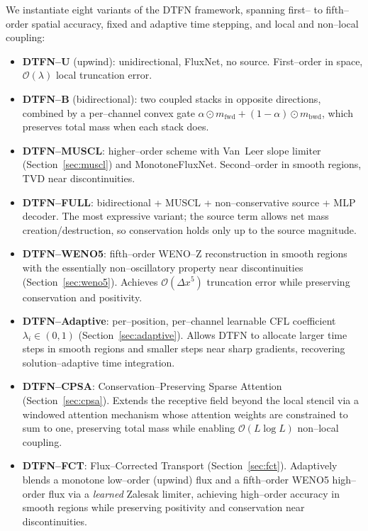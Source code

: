 \documentclass[10pt]{article}
\theoremstyle{definition}
\theoremstyle{remark}
\begin{document}
We instantiate eight variants of the DTFN framework, spanning
first-- to fifth--order spatial accuracy, fixed and adaptive time
stepping, and local and non--local coupling:

\begin{itemize}[leftmargin=*,itemsep=2pt]
  \item \textbf{DTFN--U} (upwind): unidirectional, FluxNet, no source.
        First--order in space, $\mathcal{O}(\lambda)$ local truncation
        error.
  \item \textbf{DTFN--B} (bidirectional): two coupled stacks in
        opposite directions, combined by a per--channel convex gate
        $\alpha\odot m_\text{fwd} + (1-\alpha)\odot m_\text{bwd}$,
        which preserves total mass when each stack does.
  \item \textbf{DTFN--MUSCL}: higher--order scheme with Van~Leer slope
        limiter (Section~\ref{sec:muscl}) and MonotoneFluxNet.
        Second--order in smooth regions, TVD near discontinuities.
  \item \textbf{DTFN--FULL}: bidirectional + MUSCL + non--conservative
        source + MLP decoder.  The most expressive variant; the source
        term allows net mass creation/destruction, so conservation
        holds only up to the source magnitude.
  \item \textbf{DTFN--WENO5}: fifth--order WENO--Z reconstruction
        \cite{borges2008improved} in smooth regions with the
        essentially non--oscillatory property near discontinuities
        (Section~\ref{sec:weno5}).  Achieves $\mathcal{O}(\Delta x^5)$
        truncation error while preserving conservation and positivity.
  \item \textbf{DTFN--Adaptive}: per--position, per--channel learnable
        CFL coefficient $\lambda_i \in (0,1)$ (Section~\ref{sec:adaptive}).
        Allows DTFN to allocate larger time steps in smooth regions
        and smaller steps near sharp gradients, recovering
        solution--adaptive time integration.
  \item \textbf{DTFN--CPSA}: Conservation--Preserving Sparse
        Attention (Section~\ref{sec:cpsa}).  Extends the receptive
        field beyond the local stencil via a windowed attention
        mechanism whose attention weights are constrained to sum to
        one, preserving total mass while enabling $\mathcal{O}(L\log L)$
        non--local coupling.
  \item \textbf{DTFN--FCT}: Flux--Corrected Transport
        (Section~\ref{sec:fct}).  Adaptively blends a monotone
        low--order (upwind) flux and a fifth--order WENO5 high--order
        flux via a \emph{learned} Zalesak limiter, achieving
        high--order accuracy in smooth regions while preserving
        positivity and conservation near discontinuities.
\end{itemize}
\end{document}
